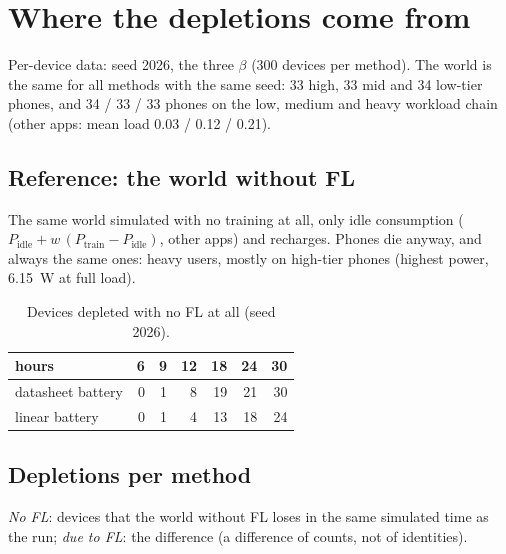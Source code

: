 \documentclass[11pt,a4paper]{article}
\begin{document}
\section{Where the depletions come from}
\label{sec:deaths}

Per-device data: seed 2026, the three $\beta$ (300 devices per method). The
world is the same for all methods with the same seed: 33 high, 33 mid and 34
low-tier phones, and 34 / 33 / 33 phones on the low, medium and heavy workload
chain (other apps: mean load 0.03 / 0.12 / 0.21).

\subsection{Reference: the world without FL}

The same world simulated with no training at all, only idle consumption
($P_{\text{idle}} + w\,(P_{\text{train}}-P_{\text{idle}})$, other apps) and
recharges. Phones die anyway, and always the same ones: heavy users, mostly on
high-tier phones (highest power, 6.15~W at full load).

\begin{table}[H]
\centering
\small
\caption{Devices depleted with no FL at all (seed 2026).}
\label{tab:nofl}
\begin{tabular}{lrrrrrr}
\toprule
hours & 6 & 9 & 12 & 18 & 24 & 30 \\
\midrule
datasheet battery & 0 & 1 & 8 & 19 & 21 & 30 \\
linear battery    & 0 & 1 & 4 & 13 & 18 & 24 \\
\bottomrule
\end{tabular}
\end{table}

\subsection{Depletions per method}

\emph{No FL}: devices that the world without FL loses in the same simulated
time as the run; \emph{due to FL}: the difference (a difference of counts, not
of identities).
\end{document}
